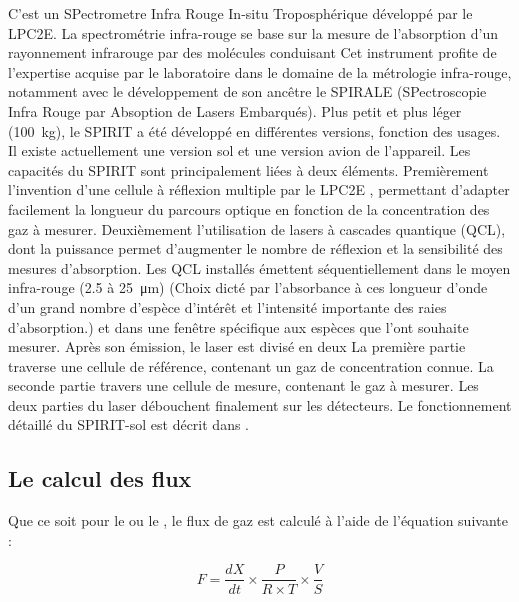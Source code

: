 C'est un SPectrometre Infra Rouge In-situ Troposphérique développé par le LPC2E.
La spectrométrie infra-rouge se base sur la mesure de l'absorption d'un rayonnement infrarouge par des molécules conduisant
Cet instrument profite de l'expertise acquise par le laboratoire dans le domaine de la métrologie infra-rouge, notamment avec le développement de son ancêtre le SPIRALE (SPectroscopie Infra Rouge par Absoption de Lasers Embarqués).
Plus petit et plus léger (\SI{100}{\kilo\gram}), le SPIRIT a été développé en différentes versions, fonction des usages.
Il existe actuellement une version sol et une version avion de l'appareil.
Les capacités du SPIRIT sont principalement liées à deux éléments.
Premièrement l'invention d'une cellule à réflexion multiple par le LPC2E \citep{robert2007}, permettant d'adapter facilement la longueur du parcours optique en fonction de la concentration des gaz à mesurer.
Deuxièmement l'utilisation de lasers à cascades quantique (QCL), dont la puissance permet d'augmenter le nombre de réflexion et la sensibilité des mesures d'absorption.
Les QCL installés émettent séquentiellement dans le moyen infra-rouge (\num{2.5} à \SI{25}{\micro\metre}) (Choix dicté par l'absorbance à ces longueur d'onde d'un grand nombre d'espèce d'intérêt et l'intensité importante des raies d'absorption.) et dans une fenêtre spécifique aux espèces que l'ont souhaite mesurer.
Après son émission, le laser est divisé en deux
La première partie traverse une cellule de référence, contenant un gaz de concentration connue.
La seconde partie travers une cellule de mesure, contenant le gaz à mesurer.
Les deux parties du laser débouchent finalement sur les détecteurs.
Le fonctionnement détaillé du SPIRIT-sol est décrit dans \cite{guimbaud2011}.


\subsection{Le calcul des flux}

Que ce soit pour le \coo ou le \chh, le flux de gaz est calculé à l'aide de l'équation suivante : 

\begin{equation}
F = \frac{dX}{dt} \times \frac{P}{R \times T} \times \frac{V}{S}
\end{equation}

